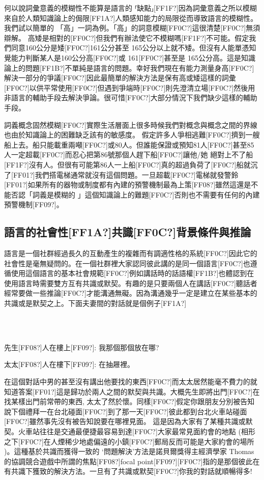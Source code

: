 何以說詞彙意義的模糊性不能算是語言的 ⸢缺點⸥[FF1F?]因為詞彙意義之所以模糊來自於人類知識論上的侷限[FF1A?]人類感知能力的局限從而導致語言的模糊性。我們試以簡單的 「高」一詞為例。「高」的詞意模糊[FF0C?]這很清楚[FF0C?]無須辯解。 高矮是相對的[FF0C?]但我們有辦法使它不模糊嗎[FF1F?]不可能。假定我們同意160公分是矮[FF0C?]161公分甚至 165公分以上就不矮。但沒有人能單憑知覺能力判斷某人是160公分高[FF0C?]或 161[FF0C?]甚至是 165公分高。這是知識論上的問題[FF1B?]不單純是語言的問題。幸好我們現在有能力測量身高[FF0C?]解決一部分的爭議[FF0C?]因此最簡單的解決方法是保有高或矮這樣的詞彙[FF0C?]以供平常使用[FF0C?]但遇到爭端時[FF0C?]則先澄清立場[FF0C?]然後用非語言的輔助手段去解決爭論。很可惜[FF0C?]大部分情況下我們缺少這樣的輔助手段。

詞義概念固然模糊[FF0C?]實際生活層面上很多時候我們對概念與概念之間的界線也由於知識論上的困難缺乏該有的敏感度。 假定許多人爭相逃難[FF0C?]擠到一艘船上去。船只能載重兩噸[FF0C?]或80人。但誰能保證或預知81人[FF0C?]甚至85人一定超載[FF0C?]而忍心把第86號那個人趕下船[FF0C?]讓他/她 絕對上不了船[FF1F?]沒有人。但很有可能第86人一上船[FF0C?]真的超過負荷了[FF0C?]船就沉了[FF01?]我們搭電梯通常就沒有這個問題。一旦超載[FF0C?]電梯就發警鈴[FF01?]如果所有的器物或制度都有內建的預警機制最為上策[FF08?]雖然這還是不能否認「詞義是模糊的 」這個知識論上的難題[FF0C?]否則也不需要有任何的內建預警機制[FF09?]。

\subsection{語言的社會性[FF1A?]共識[FF0C?]背景條件與推論}  %

語言是一個社群經過長久的互動產生的複雜而有調適性格的系統[FF0C?]因此它的社會性是毫無疑問的。在一個社群裡大家認同彼此講的是同一個語言[FF0C?]也遵循使用這個語言的基本社會規範[FF0C?]例如講話時的話語權[FF1B?]也體認到在使用語言時需要雙方互有共識或默契。有趣的是只要兩個人在講話[FF0C?]聽話者經常要做一些推論[FF0C?]才能溝通無礙。因為溝通幾乎一定是建立在某些基本的共識或是默契之上。下面夫妻間的對話就是個例子[FF1A?]

\ea%
\label{ex:key:12}
\gll\\
\\
\glt
\z

先生[FF08?]人在樓上[FF09?]: 我那個那個放在哪?

太太[FF08?]人在樓下[FF09?]:  在抽屜裡。

在這個對話中男的甚至沒有講出他要找的東西[FF0C?]而太太居然能毫不費力的就知道答案[FF01?]這是歸功於兩人之間的默契與共識。大概先生即將出門[FF0C?]在找某樣出門前常帶的東西, 太太了然於懷。同樣[FF0C?]假定你跟朋友分別被告知說下個禮拜一在台北碰面[FF0C?]到了那一天[FF0C?]彼此都到台北火車站碰面[FF0C?]雖然事先沒有被告知說要在哪裡見面。 這是因為大家有了某種共識或默契。火車站往往是交通最便捷最容易到達[FF0C?]大家最常見面約會的地點 (相形之下[FF0C?]在人煙稀少地處偏遠的小鎮[FF0C?]郵局反而可能是大家約會的場所 )。這種基於共識而獲得一致的 ‘問題解決’方法是諾貝爾獎得主經濟學家 Thomas \citet{Schelling1960} 的協調競合遊戲中所謂的焦點[FF08?]focal point[FF09?][FF0C?]指的是那個彼此在有共識下獲致的解決方法。一旦有了共識或默契[FF0C?]你我的對話就順暢得多!

